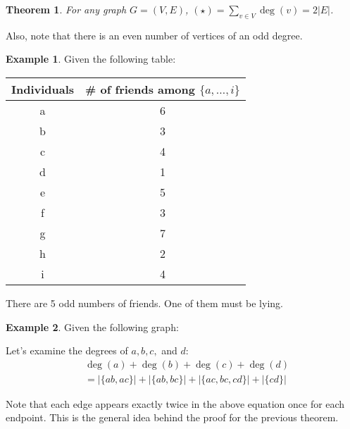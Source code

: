 \documentclass[]{article}
\newtheorem*{theorem}{Theorem}
\theoremstyle{definition}
\newtheorem{ex}{Example}[section]
\newcommand{\lecture}[1]{\marginpar{{\footnotesize $\leftarrow$ \underline{#1}}}}
\begin{document}
			\begin{theorem}
				For any graph $G = (V, E)$, $(\star) = \displaystyle \sum_{v \in V} \deg(v) = 2|E|$.
			\end{theorem}

			Also, note that there is an even number of vertices of an odd degree.
			
			\begin{ex} Given the following table:
				\begin{center}
					\begin{tabular}{c|c}
						Individuals & \# of friends among $\{a, \ldots, i\}$ \\ \hline
						a & 6 \\
						b & 3 \\
						c & 4 \\
						d & 1 \\
						e & 5 \\
						f & 3 \\
						g & 7 \\
						h & 2 \\
						i & 4
					\end{tabular}
				\end{center}
				
				There are 5 odd numbers of friends. One of them must be lying.
			\end{ex}
			
			\lecture{February 25, 2013}
			\begin{ex}
				Given the following graph:
				\begin{center}
				\end{center}

				Let's examine the degrees of $a, b, c,$ and $d$:
				\begin{align*}
					&\deg(a) + \deg(b) + \deg(c) + \deg(d) \\
					&= |\{ab, ac\}| + |\{ab, bc\}| + |\{ac, bc, cd\}| + |\{cd\}|
				\end{align*}

				Note that each edge appears exactly twice in the above equation \textendash{} once for each endpoint. This is the general idea behind the proof for the previous theorem.
			\end{ex}
\end{document}
